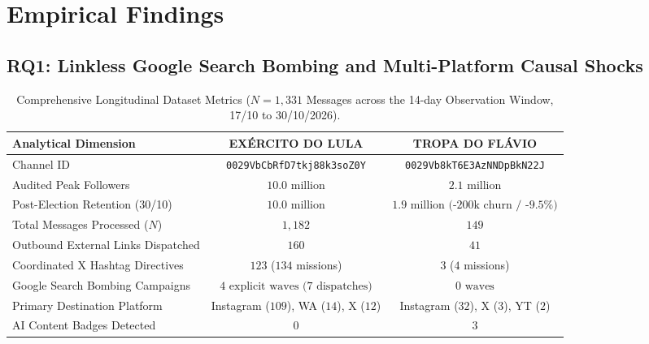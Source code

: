 \documentclass[preprint,12pt]{elsarticle}
\begin{document}
\section{Empirical Findings}\label{sec:findings}


\subsection{RQ1: Linkless Google Search Bombing and Multi-Platform Causal Shocks}

\begin{table}[htb]
\centering
\caption{Comprehensive Longitudinal Dataset Metrics ($N=1,331$ Messages across the 14-day Observation Window, 17/10 to 30/10/2026).}
\label{tab:metrics_dataset}
\begin{tabular}{@{}lcc@{}}
\toprule
\textbf{Analytical Dimension} & \textbf{EXÉRCITO DO LULA} & \textbf{TROPA DO FLÁVIO} \\ \midrule
Channel ID & \texttt{0029VbCbRfD7tkj88k3soZ0Y} & \texttt{0029Vb8kT6E3AzNNDpBkN22J} \\
Audited Peak Followers & $10.0\text{ million}$ & $2.1\text{ million}$ \\
Post-Election Retention (30/10) & $10.0\text{ million}$ & $1.9\text{ million (-200k churn / -9.5\%)}$ \\
Total Messages Processed ($N$) & $1,182$ & $149$ \\
Outbound External Links Dispatched & $160$ & $41$ \\
Coordinated X Hashtag Directives & $123$ ($134$ missions) & $3$ ($4$ missions) \\
Google Search Bombing Campaigns & $4\text{ explicit waves (7 dispatches)}$ & $0\text{ waves}$ \\
Primary Destination Platform & Instagram ($109$), WA ($14$), X ($12$) & Instagram ($32$), X ($3$), YT ($2$) \\
AI Content Badges Detected & $0$ & $3$ \\ \bottomrule
\end{tabular}
\end{table}
\end{document}
